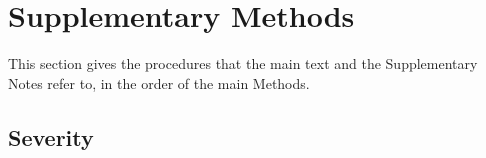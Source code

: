 %
%
%

\section*{Supplementary Methods}
\label{smethods}

This section gives the procedures that the main text and the
Supplementary Notes refer to, in the order of the main Methods.

\subsection{Severity}
\label{smeth:severity}

